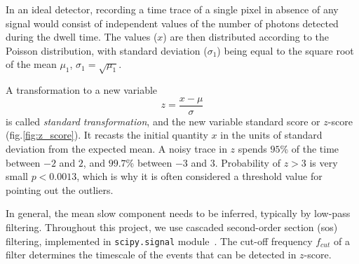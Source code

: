 \documentclass[a4paper,11pt,oneside,]{article}
\begin{document}
In an ideal detector, recording a time trace of a single pixel in absence of any signal would consist of independent values of the number of photons detected during the dwell time.
The values ($x$) are then distributed according to the Poisson distribution, with standard deviation ($\sigma_1$) being equal to the square root of the mean $\mu_1$, $\sigma_1=\sqrt{\mu_1}$.

A transformation to a new variable %
$$z=\frac{x-\mu}{\sigma}$$
is called {\it standard transformation}, and the new variable standard score or $z$-score (fig.\ref{fig:z_score}). It recasts the initial quantity $x$ in the units of standard deviation from the expected mean. A noisy trace in $z$ spends $95$\% of the time between $-2$ and $2$, and $99.7$\% between $-3$ and $3$. Probability of $z>3$ is very small $p<0.0013$, which is why it is often considered a threshold value for pointing out the outliers.

In general, the mean slow component needs to be inferred, typically by low-pass filtering. Throughout this project, we use cascaded second-order section (sos) filtering, implemented in \verb|scipy.signal| module~\cite{2020SciPy-NMeth}. The cut-off frequency $f_{cut}$ of a filter determines the timescale of the events that can be detected in $z$-score. 
\end{document}
